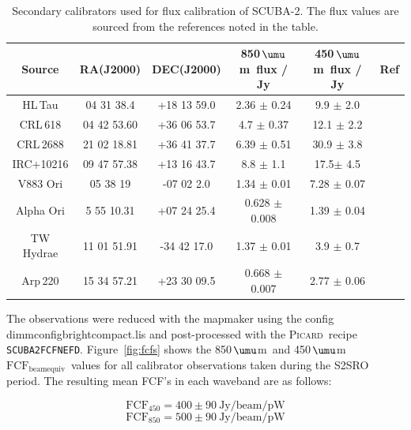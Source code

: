 \documentclass[twoside,11pt]{article}
\newcommand{\micron}{\mbox{\,${\umu}$m}}            %
\newcommand{\xref}[3]{#1}
\renewcommand{\_}{\texttt{\symbol{95}}}
\newcommand{\fcfbe}{$\mathrm{FCF_{beamequiv}}$}
\newcommand{\picard}{\xref{\textsc{Picard}}{sun231}{}}
\newcommand{\drrecipe}[1]{\texttt{#1}}
\begin{document}
\begin{table}[h]
\caption{Secondary calibrators used for flux calibration of SCUBA-2.
  The flux values are sourced from the references noted in the table. }
\label{tab1}
\begin{center}
\begin{tabular}{|c|c|c|c|c|c|}

\hline
\rule[-1ex]{0pt}{3.5ex} Source & RA(J2000) & DEC(J2000) & 850\micron\
flux / Jy & 450\micron\ flux / Jy & Ref  \\
\hline
\rule[-1ex]{0pt}{3.5ex} HL\,Tau & 04 31 38.4 & +18 13 59.0 & 2.36 $\pm$ 0.24     & 9.9 $\pm$ 2.0 & \cite{flux1}\\
\hline
\rule[-1ex]{0pt}{3.5ex} CRL\,618	& 04 42 53.60 & +36 06 53.7 & 4.7  $\pm$ 0.37   & 12.1 $\pm$ 2.2 & \cite{flux1} \\
\hline
\rule[-1ex]{0pt}{3.5ex} CRL\,2688 & 21 02 18.81 & +36 41 37.7 & 6.39  $\pm$ 0.51  & 30.9 $\pm$ 3.8 & \cite{flux1} \\
\hline
\rule[-1ex]{0pt}{3.5ex} IRC+10216 & 09 47 57.38 & +13 16 43.7 & 8.8  $\pm$ 1.1  & 17.5$\pm$ 4.5 & \cite{flux1} \\
\hline
\rule[-1ex]{0pt}{3.5ex} V883 Ori &  05 38 19  & -07 02 2.0 & 1.34 $\pm$ 0.01     & 7.28 $\pm$ 0.07 & \cite{flux2}   \\
\hline
\rule[-1ex]{0pt}{3.5ex} Alpha Ori & 5 55 10.31 & +07 24 25.4 & 0.628 $\pm$ 0.008  & 1.39 $\pm$ 0.04 & \cite{flux2}  \\
\hline
\rule[-1ex]{0pt}{3.5ex} TW Hydrae & 11 01 51.91 & -34 42 17.0 & 1.37 $\pm$ 0.01 & 3.9 $\pm$ 0.7 & \cite{flux2}  \\
\hline
\rule[-1ex]{0pt}{3.5ex} Arp\,220 & 15 34 57.21 & +23 30 09.5 & 0.668 $\pm$ 0.007  & 2.77 $\pm$ 0.06 & \cite{flux2} \\
\hline

\end{tabular}
\end{center}
\end{table}


The observations were reduced with the mapmaker using the config
dimmconfig\_bright\_compact.lis and post-processed with the \picard\
recipe \drrecipe{SCUBA2\_FCFNEFD}. Figure~\ref{fig:fcfs} shows the 850\micron\ and
450\micron\ \fcfbe\ values for all calibrator observations taken
during the S2SRO period. The resulting mean FCF's in each waveband
are as follows:

\begin{equation}
\mathrm{FCF}_{450} = 400 \pm 90 ~\mathrm{Jy/beam/pW}
\end{equation}
\begin{equation}
\mathrm{FCF}_{850} = 500 \pm 90 ~\mathrm{Jy/beam/pW}
\end{equation}
\end{document}
